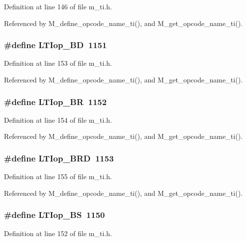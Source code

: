 Definition at line 146 of file m\_\-ti.h.

Referenced by M\_\-define\_\-opcode\_\-name\_\-ti(), and M\_\-get\_\-opcode\_\-name\_\-ti().
\subsubsection{\setlength{\rightskip}{0pt plus 5cm}\#define LTIop\_\-BD~1151}\label{m__ti_8h_c062f610c95c98a0342a87c5609b2869}




Definition at line 153 of file m\_\-ti.h.

Referenced by M\_\-define\_\-opcode\_\-name\_\-ti(), and M\_\-get\_\-opcode\_\-name\_\-ti().
\subsubsection{\setlength{\rightskip}{0pt plus 5cm}\#define LTIop\_\-BR~1152}\label{m__ti_8h_1a2cb3c1e1f43d4a0bb457bc30958b09}




Definition at line 154 of file m\_\-ti.h.

Referenced by M\_\-define\_\-opcode\_\-name\_\-ti(), and M\_\-get\_\-opcode\_\-name\_\-ti().
\subsubsection{\setlength{\rightskip}{0pt plus 5cm}\#define LTIop\_\-BRD~1153}\label{m__ti_8h_e25f5fd915e2fb3bde3711dfa70ff5c7}




Definition at line 155 of file m\_\-ti.h.

Referenced by M\_\-define\_\-opcode\_\-name\_\-ti(), and M\_\-get\_\-opcode\_\-name\_\-ti().
\subsubsection{\setlength{\rightskip}{0pt plus 5cm}\#define LTIop\_\-BS~1150}\label{m__ti_8h_4cb9e63657f2e612c050c046ad671fbe}




Definition at line 152 of file m\_\-ti.h.

